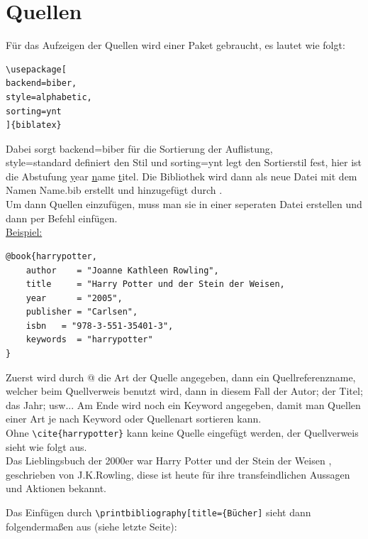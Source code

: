 \documentclass[ngerman]{scrreport}
\begin{document}
\section*{Quellen}
Für das Aufzeigen der Quellen wird einer Paket gebraucht, es lautet wie folgt:\\
{\color{blue}
\begin{verbatim}
\usepackage[
backend=biber,
style=alphabetic,
sorting=ynt
]{biblatex}

\end{verbatim}}
Dabei sorgt backend=biber für die Sortierung der Auflistung,\\
style=standard definiert den Stil und sorting=ynt legt den Sortierstil fest, hier ist die Abstufung {\color{blue}\underline{y}}ear {\color{blue}\underline{n}}ame {\color{blue}\underline{t}}itel.
Die Bibliothek wird dann als neue Datei mit dem Namen Name.bib erstellt und hinzugefügt durch {\color{blue}\verb||}.\\
\vspace{3cm}
Um dann Quellen einzufügen, muss man sie in einer seperaten Datei erstellen und dann per Befehl einfügen.\\
\underline{Beispiel:}\\
\color{blue}
\begin{verbatim}
@book{harrypotter,
    author    = "Joanne Kathleen Rowling",
    title     = "Harry Potter und der Stein der Weisen,
    year      = "2005",
    publisher = "Carlsen",
    isbn   = "978-3-551-35401-3",
    keywords  = "harrypotter"
}
\end{verbatim}

\color{black}
Zuerst wird durch @ die Art der Quelle angegeben, dann ein Quellreferenzname, welcher beim Quellverweis benutzt wird, dann in diesem Fall der Autor; der Titel; das Jahr; usw... Am Ende wird noch ein Keyword angegeben, damit man Quellen einer Art je nach Keyword oder Quellenart sortieren kann.\\
Ohne {\color{blue}\verb|\cite{harrypotter}|} kann keine Quelle eingefügt werden, der Quellverweis sieht wie folgt aus.\\
Das Lieblingsbuch der 2000er war Harry Potter und der Stein der Weisen \cite{harrypotter}, geschrieben von J.K.Rowling, diese ist heute für ihre transfeindlichen Aussagen und Aktionen bekannt.

Das Einfügen durch {\color{blue}\verb|\printbibliography[title={Bücher]|} sieht dann folgendermaßen aus (siehe letzte Seite):\\
\end{document}
